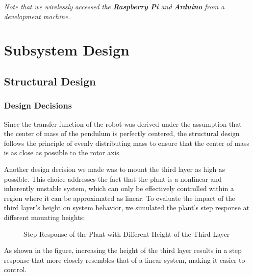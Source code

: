 \documentclass{article}
\begin{document}
\textit{Note that we wirelessly accessed the \textbf{Raspberry Pi} and \textbf{Arduino} from a development machine.}

\section{Subsystem Design}

\subsection{Structural Design}

\subsubsection{Design Decisions}
Since the transfer function of the robot was derived under the assumption that
the center of mass of the pendulum is perfectly centered, the structural design
follows the principle of evenly distributing mass to ensure that the center of
mass is as close as possible to the rotor axis.

Another design decision we made was to mount the third layer as high as
possible. This choice addresses the fact that the plant is a nonlinear and
inherently unstable system, which can only be effectively controlled within a
region where it can be approximated as linear. To evaluate the impact of the
third layer's height on system behavior, we simulated the plant's step response
at different mounting heights:

\begin{figure}[H]
    \centerline{}
    \caption{Step Response of the Plant with Different Height of the Third Layer}
\end{figure}

As shown in the figure, increasing the height of the third layer results in a
step response that more closely resembles that of a linear system, making it
easier to control.
\end{document}
